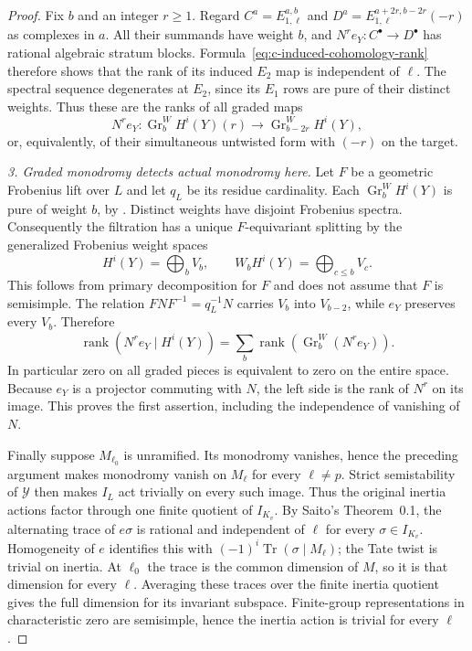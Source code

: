 \begin{proof}
Fix $b$ and an integer $r\geq1$. Regard
$C^a=E_{1,\ell}^{a,b}$ and
$D^a=E_{1,\ell}^{a+2r,b-2r}(-r)$ as complexes in $a$.
All their summands have weight $b$, and
$N^r e_Y:C^\bullet\to D^\bullet$ has rational algebraic
stratum blocks. Formula~\eqref{eq:c-induced-cohomology-rank}
therefore shows that the rank of its induced $E_2$ map is
independent of $\ell$.
The spectral sequence degenerates at $E_2$, since its $E_1$
rows are pure of their distinct weights. Thus these are the ranks
of all graded maps
\[
 N^r e_Y:\operatorname{Gr}^W_b H^i(Y)(r)
       \longrightarrow\operatorname{Gr}^W_{b-2r}H^i(Y),
\]
or, equivalently, of their simultaneous untwisted form with
$(-r)$ on the target.

\emph{3. Graded monodromy detects actual monodromy here.}
Let $F$ be a geometric Frobenius lift over $L$ and let $q_L$
be its residue cardinality. Each $\operatorname{Gr}^W_b H^i(Y)$
is pure of weight $b$, by
\citet[Lemma~3.7, author p.~42]{c_saito2003weights}.
Distinct weights have disjoint Frobenius spectra. Consequently
the filtration has a unique $F$-equivariant splitting by the
generalized Frobenius weight spaces
\[
             H^i(Y)=\bigoplus_b V_b,\qquad
             W_b H^i(Y)=\bigoplus_{c\leq b}V_c.
\]
This follows from primary decomposition for $F$ and does not
assume that $F$ is semisimple. The relation
$FNF^{-1}=q_L^{-1}N$ carries $V_b$ into $V_{b-2}$,
while $e_Y$ preserves every $V_b$. Therefore
\[
 \operatorname{rank}(N^r e_Y\mid H^i(Y))
 =\sum_b\operatorname{rank}
       (\operatorname{Gr}^W_b(N^r e_Y)).
\]
In particular zero on all graded pieces is equivalent to zero
on the entire space. Because $e_Y$ is a projector commuting with
$N$, the left side is the rank of $N^r$ on its image.
This proves the first assertion, including the independence
of vanishing of $N$.

Finally suppose $M_{\ell_0}$ is unramified. Its monodromy
vanishes, hence the preceding argument makes monodromy vanish
on $M_\ell$ for every $\ell\ne p$. Strict semistability of
$\mathcal Y$ then makes $I_L$ act trivially on every such image.
Thus the original inertia actions factor through one finite
quotient of $I_{K_v}$.
By Saito's Theorem~0.1, the alternating trace of $e\sigma$ is
rational and independent of $\ell$ for every
$\sigma\in I_{K_v}$. Homogeneity of $e$ identifies this with
$(-1)^i\operatorname{Tr}(\sigma\mid M_\ell)$; the Tate twist
is trivial on inertia. At $\ell_0$ the trace is the common
dimension of $M$, so it is that dimension for every $\ell$.
Averaging these traces over the finite inertia quotient gives
the full dimension for its invariant subspace. Finite-group
representations in characteristic zero are semisimple, hence
the inertia action is trivial for every $\ell$.
\end{proof}

